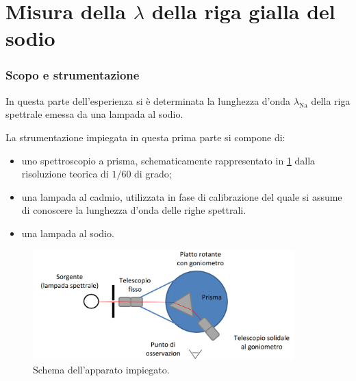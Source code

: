 \part{Misura della $\lambda$ della riga gialla del sodio}
\section{Scopo e strumentazione}
	In questa parte dell'esperienza si è determinata la lunghezza d’onda $\lambda_{\text{Na}}$ della riga spettrale emessa da una lampada al sodio.

	La strumentazione impiegata in questa prima parte si compone di:
	\begin{itemize}
		\item uno spettroscopio a	prisma, schematicamente rappresentato in \figurename{ \ref{fig:prisma}} dalla risoluzione teorica di $1/60$ di grado;
		\item una lampada al cadmio, utilizzata in fase di calibrazione del quale si assume di conoscere la lunghezza d'onda delle righe spettrali.
		\item una lampada al sodio.
	\end{itemize}

	\begin{figure} [H]
		\centering
		\includegraphics[width=0.9\textwidth]{../Figs-tabs/prisma}
		\caption{Schema dell'apparato impiegato.}
		\label{fig:prisma}
	\end{figure}
